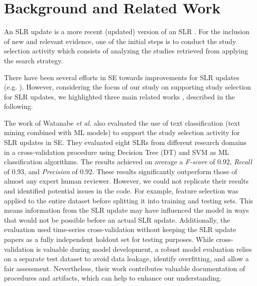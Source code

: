 \section{Background and Related Work}
\label{sec:relatedwork}

An SLR update is a more recent (updated) version of an SLR \cite{Mendes2020}. For the inclusion of new and relevant evidence, one of the initial steps is to conduct the study selection activity which consists of analyzing the studies retrieved from applying the search strategy.

There have been several efforts in SE towards improvements for SLR updates (e.g. \cite{felizardo16, Garces17, Mendes2020, Wohlin2020}). However, considering the focus of our study on supporting study selection for SLR updates, we highlighted three main related works \cite{Watanabe20, Felizardo14, Napoleao2021}, described in the following.

The work of Watanabe \textit{et al.} \cite{Watanabe20} also evaluated the use of text classification (text mining combined with ML models) to support the study selection activity for SLR updates in SE. They evaluated eight SLRs from different research domains in a cross-validation procedure using Decision Tree (DT) and SVM as ML classification algorithms. The results achieved on average a \textit{F-score} of 0.92, \textit{Recall} of 0.93, and \textit{Precision} of 0.92. These results significantly outperform those of almost any expert human reviewer. However, we could not replicate their results and identified potential issues in the code. For example, feature selection was applied to the entire dataset before splitting it into training and testing sets. This means information from the SLR update may have influenced the model in ways that would not be possible before an actual SLR update. Additionally, the evaluation used time-series cross-validation without keeping the SLR update papers as a fully independent holdout set for testing purposes. While cross-validation is valuable during model development, a robust model evaluation relies on a separate test dataset to avoid data leakage, identify overfitting, and allow a fair assessment. Nevertheless, their work contributes valuable documentation of procedures and artifacts, which can help to enhance our understanding.


